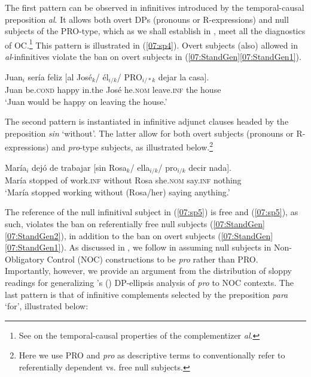 \documentclass[output=paper,colorlinks,citecolor=brown,draft,draftmode]{langscibook}
\begin{document}
The first pattern can be observed in infinitives introduced by the temporal-causal preposition \textit{al}. It allows both overt DPs (pronouns or R-expressions) and null subjects of the PRO-type, which as we shall establish in , meet all the diagnostics of OC.\footnote{See \citet{rico16} on the temporal-causal properties of the complementizer \textit{al}.} This pattern is illustrated in (\ref{07:sp4}). Overt subjects (also) allowed in \textit{al}-infinitives violate the ban on overt subjects in (\ref{07:StandGen}\ref{07:StandGen1}).

\begin{exe}
\ex \label{07:sp4}
\gll Juan$_i$ sería feliz [al José$_k$/ él$_{i/k}$/ PRO$_{i/*k}$ dejar la casa]. \\
Juan be.\textsc{cond} happy in.the José he.\textsc{nom} {} leave.\textsc{inf} the house \\
\glt ‘Juan would be happy on leaving the house.’
\end{exe}


The second pattern is instantiated in infinitive adjunct clauses headed by the preposition \textit{sin} ‘without’. The latter allow for both overt subjects (pronouns or R-expressions) and \textit{pro}-type subjects, as illustrated below.\footnote{Here we use PRO and \textit{pro} as descriptive terms to conventionally refer to referentially dependent vs. free null subjects.}

\begin{exe}
\ex \label{07:sp5}
\gll María$_i$ dejó de trabajar [sin Rosa$_k$/ ella$_{i/k}$/ pro$_{i/k}$ decir nada].\\
María stopped of work.\textsc{inf} without Rosa she.\textsc{nom} {} say.\textsc{inf} nothing \\
\glt ‘María stopped working without (Rosa/her) saying anything.’
\end{exe}

The reference of the null infinitival subject in (\ref{07:sp5}) is free and (\ref{07:sp5}), as such, violates the ban on referentially free null subjects (\ref{07:StandGen}\ref{07:StandGen2}), in addition to the ban on overt subjects (\ref{07:StandGen}\ref{07:StandGen1}). As discussed in , we follow \citet{hornstein99} in assuming null subjects in Non-Obligatory Control (NOC) constructions to be \textit{pro} rather than PRO. Importantly, however, we provide an argument from the distribution of sloppy readings for generalizing \citeauthor{duguine13}’s (\citeyear{duguine13, duguine14}) DP-ellipsis analysis of \textit{pro} to NOC contexts.
The last pattern is that of infinitive complements selected by the preposition \textit{para} ‘for’, illustrated below:
\end{document}
